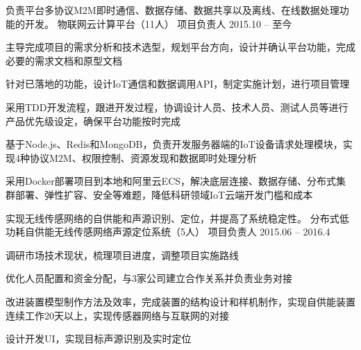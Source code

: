 


\begin{cventries}


\cventry
{负责平台多协议M2M即时通信、数据存储、数据共享以及离线、在线数据处理功能的开发。} %
{物联网云计算平台（11人）} %
{项目负责人} %
{2015.10 -- 至今} %
{ %
\begin{cvitems}
\item {主导完成项目的需求分析和技术选型，规划平台方向，设计并确认平台功能，完成必要的需求文档和原型文档}
\item {针对已落地的功能，设计IoT通信和数据调用API，制定实施计划，进行项目管理}
\item {采用TDD开发流程，跟进开发过程，协调设计人员、技术人员、测试人员等进行产品优先级设定，确保平台功能按时完成}
\item{基于Node.js、Redis和MongoDB，负责开发服务器端的IoT设备请求处理模块，实现4种协议M2M、权限控制、资源发现和数据即时处理分析}
\item{采用Docker部署项目到本地和阿里云ECS，解决底层连接、数据存储、分布式集群部署、弹性扩容、安全等难题，降低科研领域IoT云端开发门槛和成本}
\end{cvitems}
}


\cventry
{实现无线传感网络的自供能和声源识别、定位，并提高了系统稳定性。} %
{分布式低功耗自供能无线传感网络声源定位系统（5人）} %
{项目负责人} %
{2015.06 -- 2016.4} %
{ %
\begin{cvitems}
\item {调研市场技术现状，梳理项目进度，调整项目实施路线}
\item {优化人员配置和资金分配，与3家公司建立合作关系并负责业务对接}
\item{改进装置模型制作方法及效率，完成装置的结构设计和样机制作，实现自供能装置连续工作20天以上，实现传感器网络与互联网的对接}
\item{设计开发UI，实现目标声源识别及实时定位}
\end{cvitems} 
}


\end{cventries}
